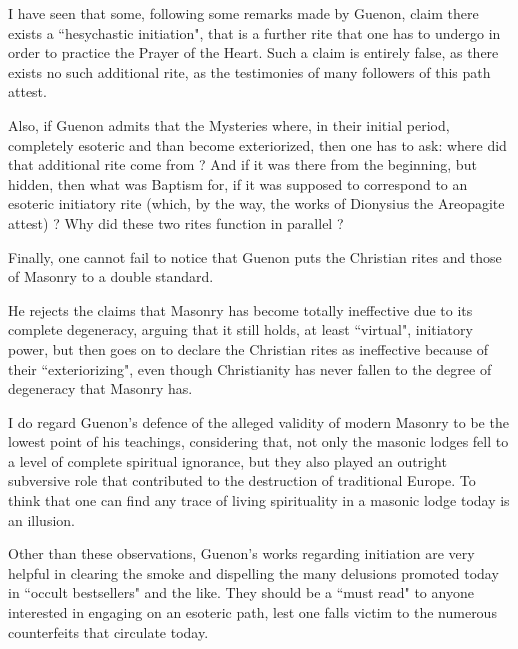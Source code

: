 \begin{footnotesize}
\begin{sffamily}
I have seen that some, following some remarks made by Guenon, claim there exists a ``hesychastic initiation", that is a further rite that one has to undergo in order to practice the Prayer of the Heart. Such a claim is entirely false, as there exists no such additional rite, as the testimonies of many followers of this path attest.

Also, if Guenon admits that the Mysteries where, in their initial period, completely esoteric and than become exteriorized, then one has to ask: where did that additional rite come from ? And if it was there from the beginning, but hidden, then what was Baptism for, if it was supposed to correspond to an esoteric initiatory rite (which, by the way, the works of Dionysius the Areopagite attest) ? Why did these two rites function in parallel ? 

Finally, one cannot fail to notice that Guenon puts the Christian rites and those of Masonry to a double standard.

He rejects the claims that Masonry has become totally ineffective due to its complete degeneracy, arguing that it still holds, at least ``virtual", initiatory power, but then goes on to declare the Christian rites as ineffective because of their ``exteriorizing", even though Christianity has never fallen to the degree of degeneracy that Masonry has.

I do regard Guenon's defence of the alleged validity of modern Masonry to be the lowest point of his teachings, considering that, not only the masonic lodges fell to a level of complete spiritual ignorance, but they also played an outright subversive role that contributed to the destruction of traditional Europe. To think that one can find any trace of living spirituality in a masonic lodge today is an illusion. 

Other than these observations, Guenon's works regarding initiation are very helpful in clearing the smoke and dispelling the many delusions promoted today in ``occult bestsellers" and the like. They should be a ``must read" to anyone interested in engaging on an esoteric path, lest one falls victim to the numerous counterfeits that circulate today.

\hfill

\end{sffamily}\end{footnotesize}
